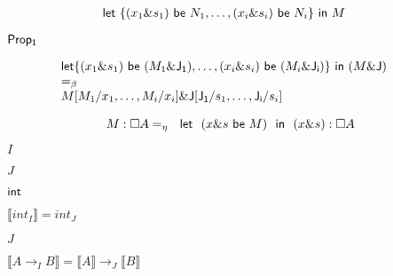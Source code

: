 \documentclass[10pt]{book}
\begin{document}
\begin{mdSnippets}
\begin{mdDisplaySnippet}[4ca4942a1c0873001ec27c63ef3a44ef]
\[\begin{array}{ll}
{\sf let} \ \{(x_1 \& s_1)\  {\sf be}\  N_1,\ldots,  (x_i \& s_i)\  {\sf be}\  N_i\}\ {\sf in}\  M &\\
\end{array}
\]%
\end{mdDisplaySnippet}%
\begin{mdInlineSnippet}%
${\sf  Prop_1 }$\end{mdInlineSnippet}%
\begin{mdDisplaySnippet}%
\[%
\begin{array}{ll} 
    {\sf let} \{(x_1 \& s_1) {\ \sf be\ } (M_1\& {\sf J_1}),\ldots,  (x_i \& s_i) {\ {\sf be}\ } (M_i\& {\sf J_i})\}\ {\sf in}\  (M \&  {\sf J})& \\
    =_{\beta} & \\
  {  M[M_1/x_1, \ldots,  M_i/x_i] \& {\sf J}[{\sf J_1}/s_1,\ldots, {\sf J_i}/s_i]}
    \end{array}
\]%
\end{mdDisplaySnippet}%
\begin{mdDisplaySnippet}%
\[%
M:\Box A =_{\eta}\ \ {\sf let} \ \ (x \& s\  {\sf be} \ M)\ \ {\sf in}\ \  { (x \& s)}:\Box A
\]%
\end{mdDisplaySnippet}%
\begin{mdInlineSnippet}[dd7536794b63bf90eccfd37f9b147d7f]%
$I$\end{mdInlineSnippet}%
\begin{mdInlineSnippet}%
$J$\end{mdInlineSnippet}%
\begin{mdInlineSnippet}[5816dd164bf4957e60b9dc378faadd4a]%
${\sf int}$\end{mdInlineSnippet}%
\begin{mdInlineSnippet}[168da4daa211ad39e7e2f103d4697538]%
$\llbracket int_I\rrbracket = int_J $\end{mdInlineSnippet}%
\begin{mdInlineSnippet}%
$J$\end{mdInlineSnippet}%
\begin{mdInlineSnippet}[3770b5b04be251b0fdf3f4fc0a74d5fe]%
$\llbracket A\rightarrow_I B\rrbracket =\llbracket A \rrbracket \rightarrow_J \llbracket B \rrbracket $\end{mdInlineSnippet}%

\end{mdSnippets}
\end{document}
